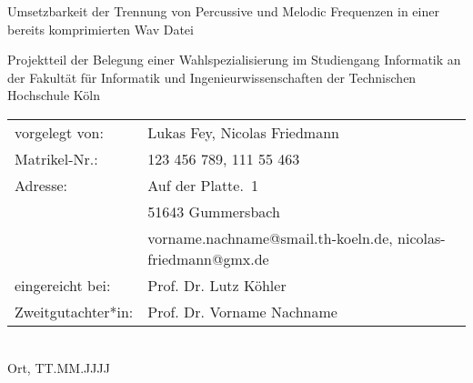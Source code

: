\begin{titlepage}
%
\sffamily%
%
\begin{center}
\end{center}
%
\vfill
%
\begin{huge}
Umsetzbarkeit der Trennung von Percussive und Melodic Frequenzen in einer bereits komprimierten Wav Datei\\[10mm]
\end{huge}
%
Projektteil der Belegung einer Wahlspezialisierung\newline
im Studiengang Informatik\newline
an der Fakultät für Informatik und Ingenieurwissenschaften\newline
der Technischen Hochschule Köln
%
\vfill
%
\begin{tabular}{@{}ll}
vorgelegt von: & Lukas Fey, Nicolas Friedmann\\
Matrikel-Nr.:  & 123 456 789, 111 55 463\\
Adresse:       & Auf der Platte.~1\\
               & 51643 Gummersbach\\
               & vorname.nachname@smail.th-koeln.de, nicolas-friedmann@gmx.de\\[5mm]
eingereicht bei:   & Prof. Dr. Lutz Köhler\\
Zweitgutachter*in: & Prof. Dr. Vorname Nachname
\end{tabular}	
%
\\[10mm]
%
Ort, TT.MM.JJJJ%
%
\rmfamily%
%
\end{titlepage}
